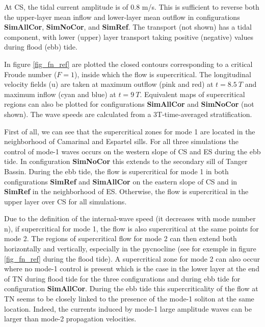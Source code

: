 \documentclass[a4paper,12pt]{article}
\begin{document}
At CS, the tidal current amplitude is of 0.8 m/s. This is sufficient to reverse both the upper-layer mean inflow and lower-layer mean outflow in configurations \textbf{SimAllCor}, \textbf{SimNoCor}, and \textbf{SimRef}. 
The transport (not shown) has a tidal component, with lower (upper) layer transport taking positive (negative) values during flood (ebb) tide. 

In figure %
 \ref{fig_fn_ref} are plotted the closed contours corresponding to a critical Froude number ($F=1$), inside which the flow is supercritical. The longitudinal velocity fields (u) are taken at maximum outflow (pink and red) at $t = 8.5\ T$ and maximum inflow (cyan and blue) at $t = 9\ T$.
Equivalent maps of supercritical regions can also be plotted for configurations \textbf{SimAllCor} and \textbf{SimNoCor} (not shown).
 The wave speeds are calculated from %
 a 3T-time-averaged stratification.%

First of all, we can see that the supercritical zones for mode 1 are located in the neighborhood of Camarinal and Espartel sills. For all three simulations the control of mode-1 waves occurs on the western slope of CS and ES during the ebb tide. In configuration \textbf{SimNoCor} this extends to the secondary sill of Tanger Bassin. During the ebb tide, the flow is supercritical for mode 1 in both configurations \textbf{SimRef} and \textbf{SimAllCor} on the eastern slope of CS and in \textbf{SimRef} in the neighborhood of ES. Otherwise, the flow is supercritical in the upper layer over CS for all simulations.

Due to the definition of the internal-wave speed (it decreases with mode number n), if supercritical for mode 1, the flow is also supercritical at the same points for mode 2. The regions of supercritical flow for mode 2 can then extend both horizontally and vertically, especially in the pycnocline (see for exemple in figure \ref{fig_fn_ref} during the flood tide).%
A supercritical zone for mode 2 can also occur where no mode-1 control is present which is the case in the lower layer at the end of TN during flood tide for the three configurations and during ebb tide for configuration \textbf{SimAllCor}. During the ebb tide this supercriticality of the flow at TN seems to be closely linked to the presence of the mode-1 soliton at the same location. Indeed, the currents induced by mode-1 large amplitude waves can be larger than mode-2 propagation velocities.  
\end{document}
